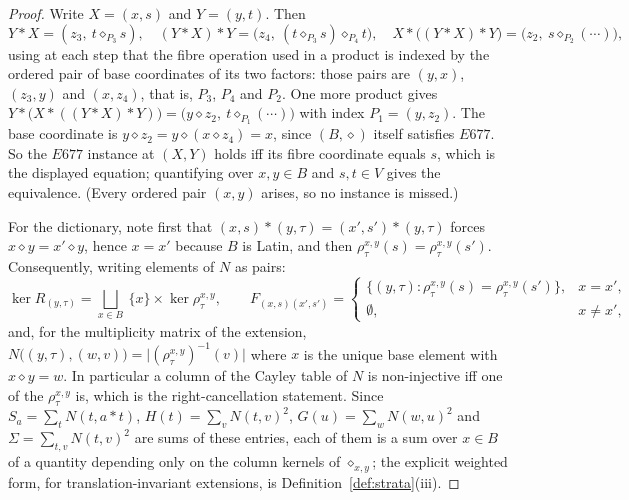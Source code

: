 \documentclass[11pt]{article}
\theoremstyle{plain}
\theoremstyle{definition}
\theoremstyle{remark}
\numberwithin{equation}{section}
\newcommand{\op}{\mathbin{*}}
\begin{document}
\begin{proof}
Write $X = (x,s)$ and $Y = (y,t)$. Then
\[
  Y\op X = (z_3,\ t\diamond_{P_3}s),\quad
  (Y\op X)\op Y = \bigl(z_4,\ (t\diamond_{P_3}s)\diamond_{P_4}t\bigr),\quad
  X\op\bigl((Y\op X)\op Y\bigr) = \bigl(z_2,\ s\diamond_{P_2}(\cdots)\bigr),
\]
using at each step that the fibre operation used in a product is indexed by the
ordered pair of base coordinates of its two factors: those pairs are $(y,x)$,
$(z_3,y)$ and $(x,z_4)$, that is, $P_3$, $P_4$ and $P_2$. One more product gives
$Y\op\bigl(X\op((Y\op X)\op Y)\bigr)
 = \bigl(y\diamond z_2,\ t\diamond_{P_1}(\cdots)\bigr)$ with index $P_1 = (y,z_2)$.
The base coordinate is $y\diamond z_2 = y\diamond(x\diamond z_4) = x$, since
$(B,\diamond)$ itself satisfies $E677$. So the $E677$ instance at $(X,Y)$ holds
iff its fibre coordinate equals $s$, which is the displayed equation; quantifying
over $x,y\in B$ and $s,t\in V$ gives the equivalence. (Every ordered pair
$(x,y)$ arises, so no instance is missed.)

For the dictionary, note first that
$(x,s)\op(y,\tau) = (x',s')\op(y,\tau)$ forces $x\diamond y = x'\diamond y$,
hence $x = x'$ because $B$ is Latin, and then
$\rho^{x,y}_\tau(s) = \rho^{x,y}_\tau(s')$. Consequently, writing elements of
$N$ as pairs:
\[
  \ker R_{(y,\tau)} = \bigsqcup_{x\in B}\ \{x\}\times\ker\rho^{x,y}_\tau ,
  \qquad
  F_{(x,s)(x',s')} =
  \begin{cases}
    \{(y,\tau) : \rho^{x,y}_\tau(s) = \rho^{x,y}_\tau(s')\}, & x = x',\\[2pt]
    \emptyset, & x\ne x',
  \end{cases}
\]
and, for the multiplicity matrix of the extension,
$N\bigl((y,\tau),(w,v)\bigr) = \bigl|(\rho^{x,y}_\tau)^{-1}(v)\bigr|$ where $x$ is
the unique base element with $x\diamond y = w$. In particular a column of the
Cayley table of $N$ is non-injective iff one of the $\rho^{x,y}_\tau$ is, which
is the right-cancellation statement. Since $S_a = \sum_tN(t,a\op t)$,
$H(t) = \sum_vN(t,v)^2$, $G(u) = \sum_wN(w,u)^2$ and $\Sigma = \sum_{t,v}N(t,v)^2$
are sums of these entries, each of them is a sum over $x\in B$ of a quantity
depending only on the column kernels of $\diamond_{x,y}$; the explicit weighted
form, for translation-invariant extensions, is
Definition~\ref{def:strata}(iii).
\end{proof}
\end{document}
